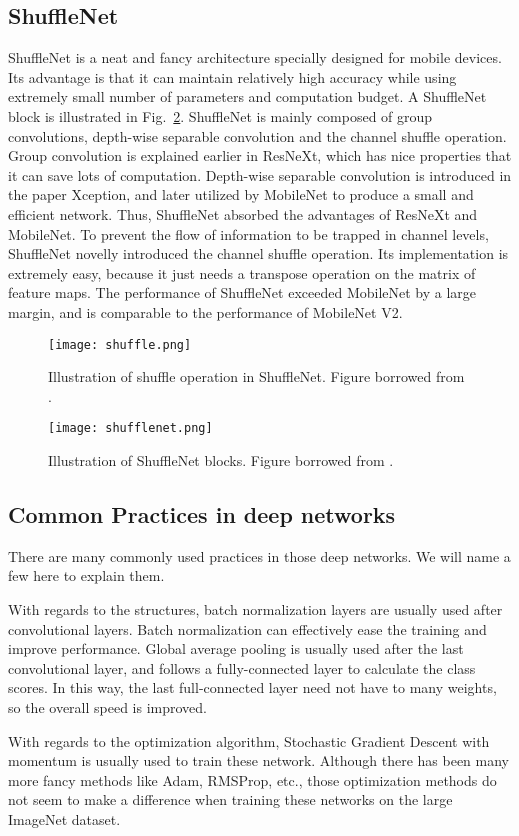 \subsection{ShuffleNet}
ShuffleNet is a neat and fancy architecture specially designed for mobile devices. Its advantage is that it can maintain relatively high accuracy while using extremely small number of parameters and computation budget. A ShuffleNet block is illustrated in Fig.~\ref{fig:shufflenet}. ShuffleNet is mainly composed of group convolutions, depth-wise separable convolution and the channel shuffle operation. Group convolution is explained earlier in ResNeXt, which has nice properties that it can save lots of computation. Depth-wise separable convolution is introduced in the paper Xception, and later utilized by MobileNet\cite{howard2017mobilenets} to produce a small and efficient network. Thus, ShuffleNet absorbed the advantages of ResNeXt and MobileNet. To prevent the flow of information to be trapped in channel levels, ShuffleNet novelly introduced the channel shuffle operation. Its implementation is extremely easy, because it just needs a transpose operation on the matrix of feature maps. The performance of ShuffleNet exceeded MobileNet by a large margin, and is comparable to the performance of MobileNet V2.
\begin{figure}[!htp]
	\centering
	\texttt{[image: shuffle.png]}
	\caption[Illustration of shuffle operation in ShuffleNets]
	{Illustration of shuffle operation in ShuffleNet. Figure borrowed from \parencite{zhang2017shufflenet}.}
	\label{fig:shuffle}
\end{figure}
\begin{figure}[!htp]
	\centering
	\texttt{[image: shufflenet.png]}
	\caption[Illustration of ShuffleNet blocks]
	{Illustration of ShuffleNet blocks. Figure borrowed from \parencite{zhang2017shufflenet}.}
	\label{fig:shufflenet}
\end{figure}

\subsection{Common Practices in deep networks}

There are many commonly used practices in those deep networks. We will name a few here to explain them.

With regards to the structures, batch normalization layers are usually used after convolutional layers. Batch normalization can effectively ease the training and improve performance. Global average pooling is usually used after the last convolutional layer, and follows a fully-connected layer to calculate the class scores. In this way, the last full-connected layer need not have to many weights, so the overall speed is improved.

With regards to the optimization algorithm, Stochastic Gradient Descent with momentum is usually used to train these network. Although there has been many more fancy methods like Adam, RMSProp, etc., those optimization methods do not seem to make a difference when training these networks on the large ImageNet dataset.